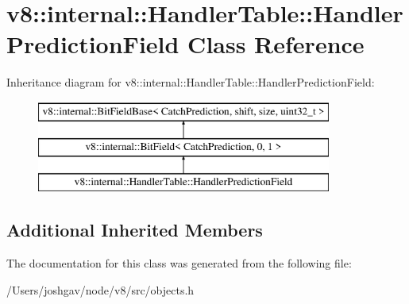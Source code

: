 \hypertarget{classv8_1_1internal_1_1_handler_table_1_1_handler_prediction_field}{}\section{v8\+:\+:internal\+:\+:Handler\+Table\+:\+:Handler\+Prediction\+Field Class Reference}
\label{classv8_1_1internal_1_1_handler_table_1_1_handler_prediction_field}
Inheritance diagram for v8\+:\+:internal\+:\+:Handler\+Table\+:\+:Handler\+Prediction\+Field\+:\begin{figure}[H]
\begin{center}
\leavevmode
\includegraphics[height=3.000000cm]{classv8_1_1internal_1_1_handler_table_1_1_handler_prediction_field}
\end{center}
\end{figure}
\subsection*{Additional Inherited Members}


The documentation for this class was generated from the following file\+:\begin{DoxyCompactItemize}
\item 
/\+Users/joshgav/node/v8/src/objects.\+h\end{DoxyCompactItemize}
